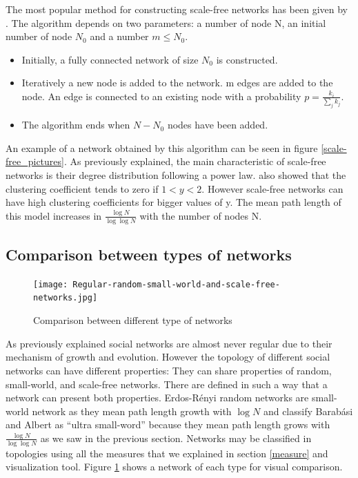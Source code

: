 \documentclass[a4paper, 12pt]{report}
\begin{document}
The most popular method for constructing scale-free networks has been given by \cite{barabasi_model}. The algorithm depends on two parameters: a number of node N, an initial number of node $N_0$ and a number $m \leq N_0$.\\
\begin{itemize}
\item Initially, a fully connected network of size $N_0$ is constructed.
\item Iteratively a new node is added to the network. m edges are added to the node. An edge is connected to an existing node with a probability $p = \frac{k_i}{\sum_{j} k_j}$.
\item The algorithm ends when $N -N_0$ nodes have been added.
\end{itemize}
An example of a network obtained by this algorithm can be seen in figure \ref{scale-free_pictures}. As previously explained, the main characteristic of scale-free networks is their degree distribution following a power law. \cite{globalClustering2} also showed that the clustering coefficient tends to zero if $ 1 < y < 2$. However scale-free networks can have high clustering coefficients for bigger values of y. The mean path length of this model increases in $\frac{\log{N}}{\log{\log{N}}}$ with the number of nodes N.\\


\subsection{Comparison between types of networks}

\begin{figure}
\centering
\texttt{[image: Regular-random-small-world-and-scale-free-networks.jpg]}
\caption{Comparison between different type of networks \citep{img_comp}}
\label{comparison_networks}
\end{figure}

As previously explained social networks are almost never regular due to their mechanism of growth and evolution. However the topology of different social networks can have different properties: They can share properties of random, small-world, and scale-free networks. There are defined in such a way that a network can present both properties. Erdos-Rényi random networks are small-world network as they mean path length growth with $\log N$ and \cite{xs} classify Barabási and Albert as ``ultra small-word'' because they mean path length grows with $\frac{\log{N}}{\log{\log{N}}}$ as we saw in the previous section. Networks may be classified in topologies using all the measures that we explained in section \ref{measure} and visualization tool. Figure \ref{comparison_networks} shows a network of each type for visual comparison.
\end{document}

